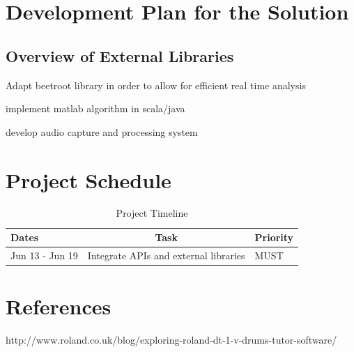 \documentclass[a4paper, 11pt]{article}
\begin{document}
\maketitle{} 
\section{Development Plan for the Solution}

\subsection{Overview of External Libraries}



Adapt beetroot library in order to allow for efficient real time analysis

implement matlab algorithm in scala/java

develop audio capture and processing system 

\maketitle{} 
\section{Project Schedule}

\begin{table}[H]
\caption{Project Timeline} 
\centering
\begin{tabular}{ | L |c| L |}
\hline\hline 
Dates & Task & Priority\\ [0.5ex]
\hline 
Jun 13 - Jun 19 & Integrate APIs and external libraries & MUST
\end{tabular}
\label{stages} 
\end{table}

\maketitle{} 
\section{References}
http://www.roland.co.uk/blog/exploring-roland-dt-1-v-drums-tutor-software/
\end{document}
